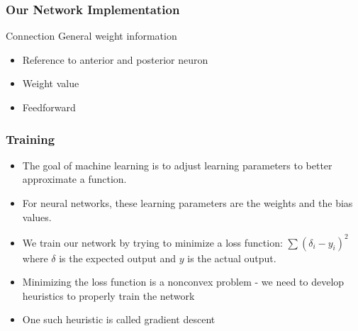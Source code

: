 \documentclass{beamer}
\begin{document}
\begin{frame}
\frametitle{Our Network Implementation}
\begin{block}{Connection}
    General weight information
    \begin{itemize}
        \item Reference to anterior and posterior neuron
        \item Weight value
        \item Feedforward
    \end{itemize}
\end{block}
\end{frame}
\begin{frame}
    \frametitle{Training}
    \begin{itemize}
        \item The goal of machine learning is to adjust learning parameters to better approximate a function.
        \item For neural networks, these learning parameters are the weights and the bias values.
        \item We train our network by trying to minimize a loss function:  $\sum (\delta_{i}-y_{i})^2$ where $\delta$ is the expected output and $y$ is the actual output.
        \item Minimizing the loss function is a nonconvex problem - we need to develop heuristics to properly train the network
        \item One such heuristic is called gradient descent
    \end{itemize}
\end{frame}
\end{document}
